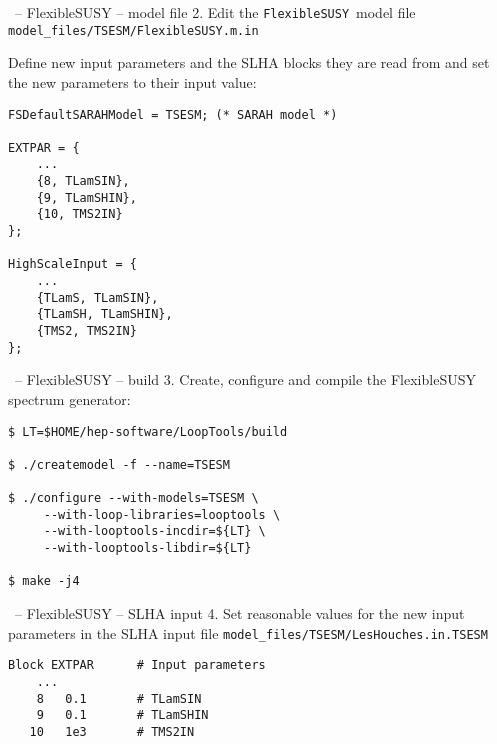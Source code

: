 \documentclass[11pt]{beamer}
\newcommand{\FlexibleSUSY}{\texttt{FlexibleSUSY}}
\begin{document}

\begin{frame}[fragile]{\insertsection\ -- FlexibleSUSY -- model file}
  2. Edit the \FlexibleSUSY\ model file
  \texttt{model\_files/TSESM/FlexibleSUSY.m.in}

  \bigskip

  Define new input parameters and the SLHA blocks they are read from
  and set the new parameters to their input value:
  \begin{lstlisting}
FSDefaultSARAHModel = TSESM; (* SARAH model *)

EXTPAR = {
    ...
    {8, TLamSIN},
    {9, TLamSHIN},
    {10, TMS2IN}
};

HighScaleInput = {
    ...
    {TLamS, TLamSIN},
    {TLamSH, TLamSHIN},
    {TMS2, TMS2IN}
};\end{lstlisting}%
\end{frame}


\begin{frame}[fragile]{\insertsection\ -- FlexibleSUSY -- build}
  3. Create, configure and compile the FlexibleSUSY spectrum
  generator:
  \begin{lstlisting}
$ LT=$HOME/hep-software/LoopTools/build

$ ./createmodel -f --name=TSESM

$ ./configure --with-models=TSESM \
     --with-loop-libraries=looptools \
     --with-looptools-incdir=${LT} \
     --with-looptools-libdir=${LT}

$ make -j4\end{lstlisting}%
\end{frame}


\begin{frame}[fragile]{\insertsection\ -- FlexibleSUSY -- SLHA input}
  4. Set reasonable values for the new input parameters in the SLHA
  input file \texttt{model\_files/TSESM/LesHouches.in.TSESM}
  \begin{lstlisting}
Block EXTPAR      # Input parameters
    ...
    8   0.1       # TLamSIN
    9   0.1       # TLamSHIN
   10   1e3       # TMS2IN\end{lstlisting}%
\end{frame}

\end{document}
